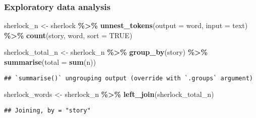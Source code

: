 \documentclass[
]{book}
\newenvironment{Shaded}{\begin{snugshade}}{\end{snugshade}}
\newcommand{\DataTypeTok}[1]{\textcolor[rgb]{0.13,0.29,0.53}{#1}}
\newcommand{\KeywordTok}[1]{\textcolor[rgb]{0.13,0.29,0.53}{\textbf{#1}}}
\newcommand{\NormalTok}[1]{#1}
\newcommand{\OperatorTok}[1]{\textcolor[rgb]{0.81,0.36,0.00}{\textbf{#1}}}
\newcommand{\OtherTok}[1]{\textcolor[rgb]{0.56,0.35,0.01}{#1}}
\newcommand{\StringTok}[1]{\textcolor[rgb]{0.31,0.60,0.02}{#1}}
\begin{document}
\hypertarget{exploratory-data-analysis}{%
\subsubsection{Exploratory data analysis}\label{exploratory-data-analysis}}

\begin{Shaded}
\begin{Highlighting}[]
\NormalTok{sherlock\_n \textless{}{-}}\StringTok{ }\NormalTok{sherlock }\OperatorTok{\%\textgreater{}\%}
\StringTok{  }\KeywordTok{unnest\_tokens}\NormalTok{(}\DataTypeTok{output =}\NormalTok{ word,}
                \DataTypeTok{input =}\NormalTok{ text) }\OperatorTok{\%\textgreater{}\%}
\StringTok{  }\KeywordTok{count}\NormalTok{(story, word, }\DataTypeTok{sort =} \OtherTok{TRUE}\NormalTok{)}

\NormalTok{sherlock\_total\_n \textless{}{-}}\StringTok{ }\NormalTok{sherlock\_n }\OperatorTok{\%\textgreater{}\%}
\StringTok{  }\KeywordTok{group\_by}\NormalTok{(story) }\OperatorTok{\%\textgreater{}\%}
\StringTok{  }\KeywordTok{summarise}\NormalTok{(}\DataTypeTok{total =} \KeywordTok{sum}\NormalTok{(n))}
\end{Highlighting}
\end{Shaded}

\begin{verbatim}
## `summarise()` ungrouping output (override with `.groups` argument)
\end{verbatim}

\begin{Shaded}
\begin{Highlighting}[]
\NormalTok{sherlock\_words \textless{}{-}}\StringTok{ }\NormalTok{sherlock\_n }\OperatorTok{\%\textgreater{}\%}\StringTok{ }\KeywordTok{left\_join}\NormalTok{(sherlock\_total\_n)}
\end{Highlighting}
\end{Shaded}

\begin{verbatim}
## Joining, by = "story"
\end{verbatim}
\end{document}
